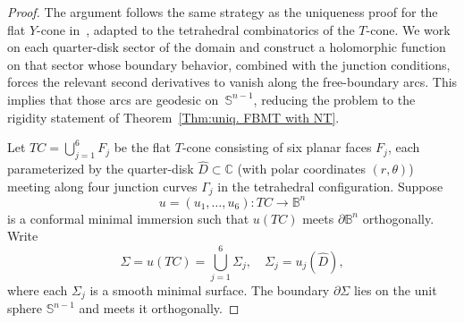 \documentclass[11pt]{amsart}
\numberwithin{equation}{section}
\theoremstyle{theorem}
\theoremstyle{definition}
\numberwithin{equation}{section}
\begin{document}
\begin{proof}
    The argument follows the same strategy as the uniqueness proof for the flat $Y$-cone in~\cite{matinpour2025cone}, adapted to the tetrahedral combinatorics of the $T$-cone. We work on each quarter-disk sector of the domain and construct a holomorphic function on that sector whose boundary behavior, combined with the junction conditions, forces the relevant second derivatives to vanish along the free-boundary arcs. This implies that those arcs are geodesic on~$\mathbb{S}^{n-1}$, reducing the problem to the rigidity statement of Theorem~\ref{Thm:uniq. FBMT with NT}.
\medskip

Let $TC = \bigcup_{j=1}^{6} F_j$ be the flat $T$-cone consisting of six planar faces $F_j$, each parameterized by the quarter-disk $\hat{D}\subset\mathbb{C}$ (with polar coordinates $(r,\theta)$) meeting along four junction curves $\Gamma_j$ in the tetrahedral configuration. Suppose
\[
u = (u_1,\dots,u_6) : TC \to \mathbb{B}^n
\]
is a conformal minimal immersion such that $u(TC)$ meets $\partial\mathbb{B}^n$ orthogonally. Write
\[
\Sigma = u(TC) = \bigcup_{j=1}^{6} \Sigma_j, \quad \Sigma_j = u_j(\hat{D}),
\]
where each $\Sigma_j$ is a smooth minimal surface. The boundary $\partial\Sigma$ lies on the unit sphere $\mathbb{S}^{n-1}$ and meets it orthogonally.
\medskip


\end{proof}
\end{document}
